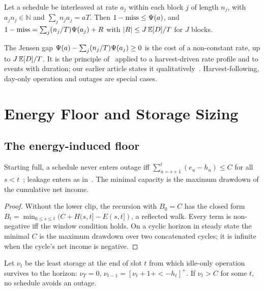 \begin{corollary}\label{cor:jensen}
Let a schedule be interleaved at rate $a_j$ within each block $j$ of length $n_j$, with $a_jn_j\in\mathbb{N}$ and $\sum_jn_ja_j=aT$. Then $1-\mathrm{miss}\le\Psi(a)$, and $1-\mathrm{miss}=\sum_j(n_j/T)\Psi(a_j)+R$ with $|R|\le J\,\mathbb{E}[D]/T$ for $J$ blocks.
\end{corollary}
\noindent The Jensen gap $\Psi(a)-\sum_j(n_j/T)\Psi(a_j)\ge0$ is the cost of a non-constant rate, up to $J\,\mathbb{E}[D]/T$. It is the principle of~\cite[Thm.~1]{kar2006ton} applied to a harvest-driven rate profile and to events with duration; our earlier article states it qualitatively~\cite{deep3_jiot2026}. Harvest-following, day-only operation and outages are special cases.

\section{Energy Floor and Storage Sizing}\label{sec:energy}
\subsection{The energy-induced floor}\label{sec:efloor}
\begin{lemma}\label{lem:moser}
Starting full, a schedule never enters outage iff $\sum_{u=s+1}^t(e_u-h_u)\le C$ for all $s<t$~\cite[Thms.~4,5]{moser2007rts}; leakage enters as in~\cite[Eq.~8]{kansal2007}. The minimal capacity is the maximum drawdown of the cumulative net income.
\end{lemma}
\begin{proof}
Without the lower clip, the recursion with $B_0=C$ has the closed form $B_t=\min_{0\le s\le t}(C+H(s,t]-E(s,t])$, a reflected walk. Every term is non-negative iff the window condition holds. On a cyclic horizon in steady state the minimal $C$ is the maximum drawdown over two concatenated cycles; it is infinite when the cycle's net income is negative.
\end{proof}

Let $\nu_t$ be the least storage at the end of slot $t$ from which idle-only operation survives to the horizon: $\nu_T=0$, $\nu_{t-1}=[\nu_t+1+\lt-h_t]^+$. If $\nu_t>C$ for some $t$, no schedule avoids an outage.

